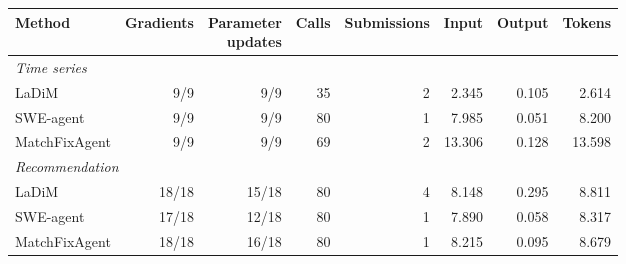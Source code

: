 \begin{tabular*}{\linewidth}{@{\extracolsep{\fill}}lrrrrrrr@{}}
\toprule
\textbf{Method} & \textbf{Gradients} & \thead{Parameter\\updates} & \textbf{Calls} & \textbf{Submissions} & \textbf{Input} & \textbf{Output} & \textbf{Tokens} \\
\midrule
\multicolumn{8}{l}{\textit{Time series}} \\
LaDiM & 9/9 & 9/9 & 35 & 2 & 2.345 & 0.105 & 2.614 \\
SWE-agent & 9/9 & 9/9 & 80 & 1 & 7.985 & 0.051 & 8.200 \\
MatchFixAgent & 9/9 & 9/9 & 69 & 2 & 13.306 & 0.128 & 13.598 \\
\midrule
\multicolumn{8}{l}{\textit{Recommendation}} \\
LaDiM & 18/18 & 15/18 & 80 & 4 & 8.148 & 0.295 & 8.811 \\
SWE-agent & 17/18 & 12/18 & 80 & 1 & 7.890 & 0.058 & 8.317 \\
MatchFixAgent & 18/18 & 16/18 & 80 & 1 & 8.215 & 0.095 & 8.679 \\
\bottomrule
\end{tabular*}
